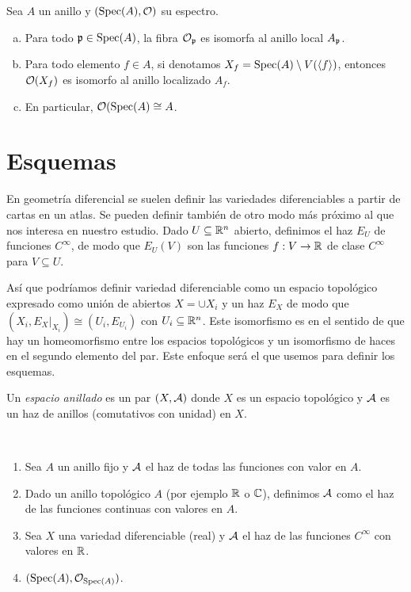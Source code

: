 \documentclass[GA.tex]{subfiles}
\begin{document}
\begin{prop}
Sea $A$ un anillo y $(\operatorname{Spec}(A),{\mathcal O})$ su espectro.
\begin{enumerate}[(a)]
\item Para todo ${\mathfrak{p}}\in\operatorname{Spec}(A)$, la fibra ${\mathcal O}_{\mathfrak{p}}$ es isomorfa al anillo local $A_{\mathfrak{p}}$.
\item Para todo elemento $f\in A$, si denotamos $X_f=\operatorname{Spec}(A)\setminus V(\langle{f}\rangle)$, entonces ${\mathcal O}(X_f)$ es isomorfo al anillo localizado $A_f$.
\item En particular, ${\mathcal O}(\operatorname{Spec}(A)\cong A$. 
\end{enumerate} 
\end{prop}

\section{Esquemas}

En geometría diferencial se suelen definir las variedades diferenciables a partir de cartas en un atlas. Se pueden definir también de otro modo más próximo al que nos interesa en nuestro estudio. Dado $U\subseteq\mathbb{R}^n$ abierto, definimos el haz $E_U$ de funciones $C^{\infty}$, de modo que $E_U(V)$ son las funciones $f:V\to\mathbb{R}$ de clase $C^{\infty}$ para $V\subseteq U$.

 Así que podríamos definir variedad diferenciable como un espacio topológico expresado como unión de abiertos $X=\cup X_i$ y un haz $E_X$ de modo que $(X_i,E_X|_{X_i})\cong (U_i,E_{U_i})$ con $U_i\subseteq\mathbb{R}^n$. Este isomorfismo es en el sentido de que hay un homeomorfismo entre los espacios topológicos y un isomorfismo de haces en el segundo elemento del par. Este enfoque será el que usemos para definir los esquemas. 
 
 
 \begin{defi}
 Un \emph{espacio anillado} es un par $(X,\mathcal{A})$ donde $X$ es un espacio topológico y $\mathcal{A}$ es un haz de anillos (comutativos con unidad) en $X$.
 \end{defi}
 
 \begin{ejs}\
 \begin{enumerate}
 \item Sea $A$ un anillo fijo y $\mathcal{A}$ el haz de todas las funciones con valor en $A$. 
 \item Dado un anillo topológico $A$ (por ejemplo $\mathbb{R}$ o $\mathbb{C}$), definimos $\mathcal{A}$ como el haz de las funciones continuas con valores en $A$.
 \item Sea $X$ una variedad diferenciable (real) y $\mathcal{A}$ el haz de las funciones $C^{\infty}$ con valores en $\mathbb{R}$.
 \item $(\operatorname{Spec}(A), {\mathcal O}_{\operatorname{Spec}(A)})$. 
 \end{enumerate}
 
 \end{ejs}
 
\end{document}
